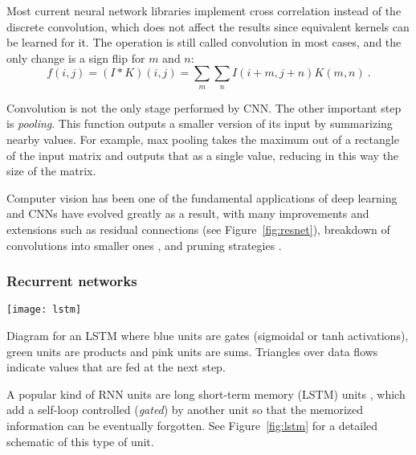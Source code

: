 Most current neural network libraries implement cross correlation instead of the discrete convolution, which does not affect the results since equivalent kernels can be learned for it. The operation is still called convolution in most cases, and the only change is a sign flip for $m$ and $n$:
\begin{equation}
    f(i,j)=\left(I\ast K\right)(i,j)=\sum_{m}\sum_{n}I(i+m,j+n)K(m,n)~.
\end{equation}

Convolution is not the only stage performed by CNN. The other important step is \textit{pooling}. This function outputs a smaller version of its input by summarizing nearby values. For example, max pooling  takes the maximum out of a rectangle of the input matrix and outputs that as a single value, reducing in this way the size of the matrix.

Computer vision has been one of the fundamental applications of deep learning and CNNs have evolved greatly as a result, with many improvements and extensions such as residual connections (see Figure~\ref{fig:resnet}), breakdown of convolutions into smaller ones , and pruning strategies .


\subsubsection{Recurrent networks}


\begin{marginfigure}
    \texttt{[image: lstm]}
    \caption{\label{fig:lstm}Diagram for an LSTM where blue units are gates (sigmoidal or tanh activations), green units are products and pink units are sums. Triangles over data flows indicate values that are fed at the next step.}
\end{marginfigure}

A popular kind of RNN units are long short-term memory (LSTM) units , which add a self-loop controlled (\textit{gated}) by another unit so that the memorized information can be eventually forgotten. See Figure~\ref{fig:lstm} for a detailed schematic of this type of unit.


